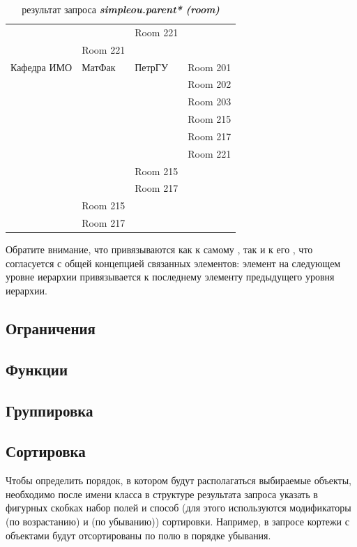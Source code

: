 \begin{table}[p]
\begin{tabular}{|l|l|l|l|}
	\cline{3-4}
		    &  & Room 221 & \\
	\cline{2-4}
				& Room 221 &  & \\
	\hline
	Кафедра ИМО & МатФак & ПетрГУ & Room 201\\
	\cline{4-4}
		    &  &  & Room 202\\
	\cline{4-4}
		    &  &  & Room 203\\
	\cline{4-4}
		    &  &  & Room 215\\
	\cline{4-4}
		    &  &  & Room 217\\
	\cline{4-4}
		    &  &  & Room 221\\
	\cline{3-4}
		    &  & Room 215 & \\
	\cline{3-4}
		    &  & Room 217 & \\
	\cline{2-4}
		    & Room 215 & & \\
	\cline{2-4}
		    & Room 217 & & \\
	\hline
    \end{tabular}
    \caption{результат запроса \itshape{\bfseries{simpleou.parent* (room)}}}
    \label{table:complex-query}

\end{table}

Обратите внимание, что  привязываются как к самому , так и к
его , что согласуется с общей концепцией связанных элементов: элемент
на следующем уровне иерархии привязывается к последнему элементу предыдущего уровня
иерархии.

\subsection{Ограничения}


\subsection{Функции}


\subsection{Группировка}


\subsection{Сортировка}
Чтобы определить порядок, в котором будут располагаться 
выбираемые объекты, необходимо после имени класса
в структуре результата запроса указать в фигурных скобках набор полей и способ 
(для этого используются модификаторы  (по возрастанию) и  (по убыванию))
сортировки. Например, в запросе
кортежи с объектами  будут отсортированы по полю  в порядке 
убывания. 

